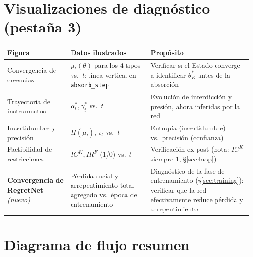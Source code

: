 \documentclass[ecta,nameyear,draft]{econsocart}
\newcommand{\pyvar}[1]{\texttt{#1}}
\begin{document}
\section{Visualizaciones de diagnóstico (pestaña 3)}

\begin{center}
\footnotesize
\begin{tabular}{@{}p{3.3cm}p{3.9cm}p{5.1cm}@{}}
\toprule
\textbf{Figura} & \textbf{Datos ilustrados} & \textbf{Propósito} \\
\midrule
Convergencia de creencias & $\mu_t(\theta)$ para los 4 tipos vs.\ $t$; línea vertical en \pyvar{absorb\_step} & Verificar si el Estado converge a identificar $\theta_K^\ast$ antes de la absorción \\
Trayectoria de instrumentos & $\alpha_t^\ast,\gamma_t^\ast$ vs.\ $t$ & Evolución de interdicción y presión, ahora inferidas por la red \\
Incertidumbre y precisión & $H(\mu_t),\ \iota_t$ vs.\ $t$ & Entropía (incertidumbre) vs.\ precisión (confianza) \\
Factibilidad de restricciones & $IC^K, IR^F$ (1/0) vs.\ $t$ & Verificación ex-post (nota: $IC^K$ siempre 1, \S\ref{sec:loop}) \\
\textbf{Convergencia de RegretNet} \emph{(nuevo)} & Pérdida social y arrepentimiento total agregado vs.\ época de entrenamiento & Diagnóstico de la fase de entrenamiento (\S\ref{sec:training}): verificar que la red efectivamente reduce pérdida y arrepentimiento \\
\bottomrule
\end{tabular}
\normalsize
\end{center}

\section{Diagrama de flujo resumen}
\end{document}

